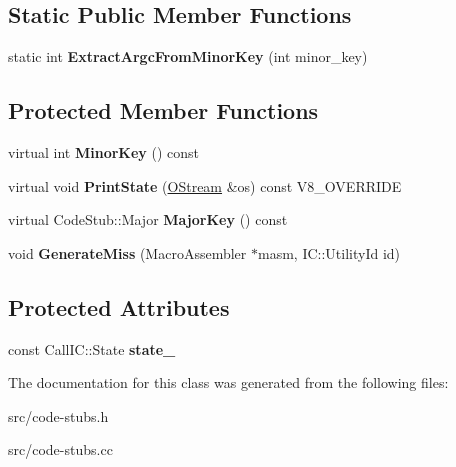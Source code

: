 \subsection*{Static Public Member Functions}
\begin{DoxyCompactItemize}
\item 
\hypertarget{classv8_1_1internal_1_1_call_i_c_stub_aa2f1578945dc547b9581d461ea64340e}{}static int {\bfseries Extract\+Argc\+From\+Minor\+Key} (int minor\+\_\+key)\label{classv8_1_1internal_1_1_call_i_c_stub_aa2f1578945dc547b9581d461ea64340e}

\end{DoxyCompactItemize}
\subsection*{Protected Member Functions}
\begin{DoxyCompactItemize}
\item 
\hypertarget{classv8_1_1internal_1_1_call_i_c_stub_a1b798e5778b05f4c2f0bb34c377fc9a5}{}virtual int {\bfseries Minor\+Key} () const \label{classv8_1_1internal_1_1_call_i_c_stub_a1b798e5778b05f4c2f0bb34c377fc9a5}

\item 
\hypertarget{classv8_1_1internal_1_1_call_i_c_stub_a551f7ab2e61a398643a186fab5b19a75}{}virtual void {\bfseries Print\+State} (\hyperlink{classv8_1_1internal_1_1_o_stream}{O\+Stream} \&os) const V8\+\_\+\+O\+V\+E\+R\+R\+I\+D\+E\label{classv8_1_1internal_1_1_call_i_c_stub_a551f7ab2e61a398643a186fab5b19a75}

\item 
\hypertarget{classv8_1_1internal_1_1_call_i_c_stub_addb33f1d12e72427900206af5993bb7e}{}virtual Code\+Stub\+::\+Major {\bfseries Major\+Key} () const \label{classv8_1_1internal_1_1_call_i_c_stub_addb33f1d12e72427900206af5993bb7e}

\item 
\hypertarget{classv8_1_1internal_1_1_call_i_c_stub_a7b2cb49faef467214ad0d4f9b7eb62a4}{}void {\bfseries Generate\+Miss} (Macro\+Assembler $\ast$masm, I\+C\+::\+Utility\+Id id)\label{classv8_1_1internal_1_1_call_i_c_stub_a7b2cb49faef467214ad0d4f9b7eb62a4}

\end{DoxyCompactItemize}
\subsection*{Protected Attributes}
\begin{DoxyCompactItemize}
\item 
\hypertarget{classv8_1_1internal_1_1_call_i_c_stub_aab0234a8ec377d0b1fe5d797eb8eb809}{}const Call\+I\+C\+::\+State {\bfseries state\+\_\+}\label{classv8_1_1internal_1_1_call_i_c_stub_aab0234a8ec377d0b1fe5d797eb8eb809}

\end{DoxyCompactItemize}


The documentation for this class was generated from the following files\+:\begin{DoxyCompactItemize}
\item 
src/code-\/stubs.\+h\item 
src/code-\/stubs.\+cc\end{DoxyCompactItemize}
